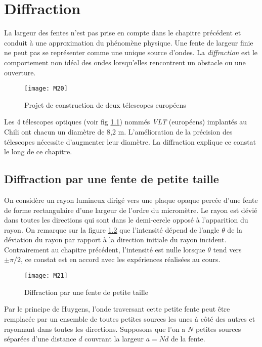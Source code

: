 \chapter{Diffraction} %

La largeur des fentes n'est pas prise en compte dans le chapitre précédent et conduit à une approximation du phénomène physique. Une fente de largeur finie ne peut pas se représenter comme une unique source d'ondes. La \textit{diffraction} est le comportement non idéal des ondes lorsqu’elles rencontrent un obstacle ou une ouverture.

\begin{figure}[h]
    \centering
    \texttt{[image: M20]}
    \caption{Projet de construction de deux télescopes européens}
    \label{tele}
\end{figure}

\noindent Les 4 télescopes optiques (voir fig \ref{tele})
nommés \textit{VLT} (européens) implantés au Chili ont chacun un diamètre de 8,2 m.
L'amélioration de la précision des télescopes nécessite d'augmenter leur diamètre. La diffraction explique ce constat le long de ce chapitre.

\section{Diffraction par une fente de petite taille}

On considère un rayon lumineux dirigé vers une plaque opaque percée d'une fente de forme rectangulaire d'une largeur de l'ordre du micromètre. Le rayon est dévié dans toutes les directions qui sont dans le demi-cercle opposé à l'apparition du rayon. On remarque sur la figure \ref{d1} que l'intensité dépend de l'angle $\theta$ de la déviation du rayon par rapport à la direction initiale du rayon incident. Contrairement au chapitre précédent, l'intensité est nulle lorsque $\theta$ tend vers $\pm \pi/2$, ce constat est en accord avec les expériences réalisées au cours.

\begin{figure}[h]
    \centering
    \texttt{[image: M21]}
    \caption{Diffraction par une fente de petite taille}
    \label{d1}
\end{figure}


\noindent Par le principe de Huygens, l'onde traversant cette petite fente peut être remplacée par un ensemble de toutes petites sources les unes à côté des autres et rayonnant dans toutes les directions. Supposons que l'on a $N$ petites sources séparées d'une distance $d$ couvrant la largeur $a=Nd$ de la fente.

